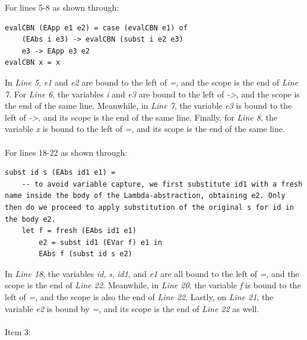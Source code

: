 \documentclass{article}
\theoremstyle{theorem}
\theoremstyle{definition}
\theoremstyle{remark}
\begin{document}
For lines 5-8 as shown through:
\begin{lstlisting}
evalCBN (EApp e1 e2) = case (evalCBN e1) of
    (EAbs i e3) -> evalCBN (subst i e2 e3)
    e3 -> EApp e3 e2
evalCBN x = x
\end{lstlisting}
In \textit{Line 5}, \textit{e1} and \textit{e2} are bound to the left of \textit{=}, and the scope is the end of \textit{Line 7}. For \textit{Line 6}, the variables \textit{i} and \textit{e3} are bound to the left of \textit{->}, and the scope is the end of the same line. Meanwhile, in \textit{Line 7}, the variable \textit{e3} is bound to the left of \textit{->}, and its scope is the end of the same line. Finally, for \textit{Line 8}, the variable \textit{x} is bound to the left of \textit{=}, and its scope is the end of the same line.
\\
\\
For lines 18-22 as shown through:
\begin{lstlisting}
subst id s (EAbs id1 e1) =
    -- to avoid variable capture, we first substitute id1 with a fresh name inside the body of the Lambda-abstraction, obtaining e2. Only then do we proceed to apply substitution of the original s for id in the body e2.
    let f = fresh (EAbs id1 e1)
        e2 = subst id1 (EVar f) e1 in
        EAbs f (subst id s e2)
\end{lstlisting}
In \textit{Line 18}, the variables \textit{id}, \textit{s}, \textit{id1}, and \textit{e1} are all bound to the left of \textit{=}, and the scope is the end of \textit{Line 22}. Meanwhile, in \textit{Line 20}, the variable \textit{f} is bound to the left of \textit{=}, and the scope is also the end of \textit{Line 22}. Lastly, on \textit{Line 21}, the variable \textit{e2} is bound by \textit{=}, and its scope is the end of \textit{Line 22} as well.
\\
\\
Item 3:
\end{document}
